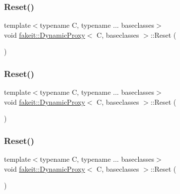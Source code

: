 \subsubsection{\texorpdfstring{Reset()}{Reset()}\hspace{0.1cm}{\footnotesize\ttfamily [6/9]}}
{\footnotesize\ttfamily template$<$typename C, typename ... baseclasses$>$ \\
void \mbox{\hyperlink{structfakeit_1_1DynamicProxy}{fakeit\+::\+Dynamic\+Proxy}}$<$ C, baseclasses $>$\+::Reset (\begin{DoxyParamCaption}{ }\end{DoxyParamCaption})\hspace{0.3cm}{\ttfamily [inline]}}

\mbox{\label{structfakeit_1_1DynamicProxy_a8f00dd7c68a247f715ec3925f662de9f}} 
\subsubsection{\texorpdfstring{Reset()}{Reset()}\hspace{0.1cm}{\footnotesize\ttfamily [7/9]}}
{\footnotesize\ttfamily template$<$typename C, typename ... baseclasses$>$ \\
void \mbox{\hyperlink{structfakeit_1_1DynamicProxy}{fakeit\+::\+Dynamic\+Proxy}}$<$ C, baseclasses $>$\+::Reset (\begin{DoxyParamCaption}{ }\end{DoxyParamCaption})\hspace{0.3cm}{\ttfamily [inline]}}

\mbox{\label{structfakeit_1_1DynamicProxy_a8f00dd7c68a247f715ec3925f662de9f}} 
\subsubsection{\texorpdfstring{Reset()}{Reset()}\hspace{0.1cm}{\footnotesize\ttfamily [8/9]}}
{\footnotesize\ttfamily template$<$typename C, typename ... baseclasses$>$ \\
void \mbox{\hyperlink{structfakeit_1_1DynamicProxy}{fakeit\+::\+Dynamic\+Proxy}}$<$ C, baseclasses $>$\+::Reset (\begin{DoxyParamCaption}{ }\end{DoxyParamCaption})\hspace{0.3cm}{\ttfamily [inline]}}


